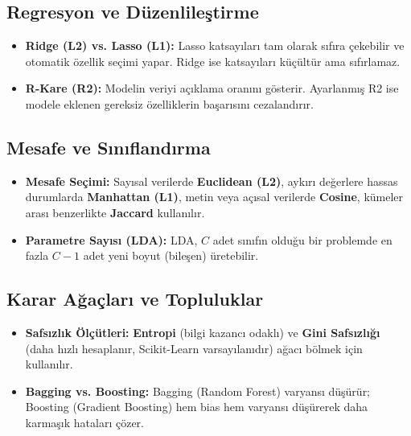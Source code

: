 \documentclass[12pt,a4paper]{article}
\begin{document}
\subsection{Regresyon ve Düzenlileştirme}
\begin{itemize}
    \item \textbf{Ridge (L2) vs. Lasso (L1):} Lasso katsayıları tam olarak sıfıra çekebilir ve otomatik özellik seçimi yapar. Ridge ise katsayıları küçültür ama sıfırlamaz.
    \item \textbf{R-Kare (R2):} Modelin veriyi açıklama oranını gösterir. Ayarlanmış R2 ise modele eklenen gereksiz özelliklerin başarısını cezalandırır.
\end{itemize}

\subsection{Mesafe ve Sınıflandırma}
\begin{itemize}
    \item \textbf{Mesafe Seçimi:} Sayısal verilerde \textbf{Euclidean (L2)}, aykırı değerlere hassas durumlarda \textbf{Manhattan (L1)}, metin veya açısal verilerde \textbf{Cosine}, kümeler arası benzerlikte \textbf{Jaccard} kullanılır.
    \item \textbf{Parametre Sayısı (LDA):} LDA, $C$ adet sınıfın olduğu bir problemde en fazla $C-1$ adet yeni boyut (bileşen) üretebilir.
\end{itemize}

\subsection{Karar Ağaçları ve Topluluklar}
\begin{itemize}
    \item \textbf{Safsızlık Ölçütleri:} \textbf{Entropi} (bilgi kazancı odaklı) ve \textbf{Gini Safsızlığı} (daha hızlı hesaplanır, Scikit-Learn varsayılanıdır) ağacı bölmek için kullanılır.
    \item \textbf{Bagging vs. Boosting:} Bagging (Random Forest) varyansı düşürür; Boosting (Gradient Boosting) hem bias hem varyansı düşürerek daha karmaşık hataları çözer.
\end{itemize}

\newpage

\end{document}
